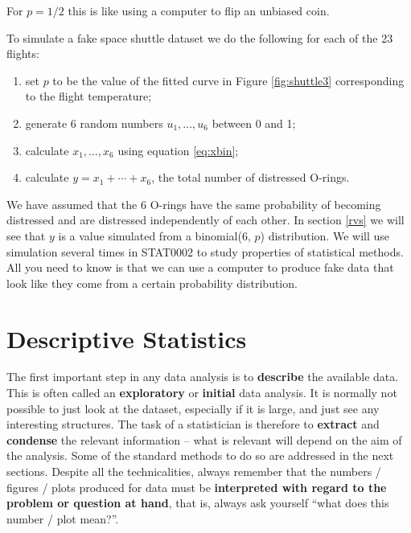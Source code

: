 \documentclass[
  british,
]{book}
\providecommand{\tightlist}{%
  \setlength{\itemsep}{0pt}\setlength{\parskip}{0pt}}
\begin{document}
For \(p=1/2\) this is like using a computer to flip an unbiased coin.

To simulate a fake space shuttle dataset we do the following for each of the 23 flights:

\begin{enumerate}
\def\labelenumi{\arabic{enumi}.}
\tightlist
\item
  set \(p\) to be the value of the fitted curve in Figure \ref{fig:shuttle3} corresponding to the flight temperature;
\item
  generate 6 random numbers \(u_1, \ldots, u_6\) between 0 and 1;
\item
  calculate \(x_1, \ldots, x_6\) using equation \eqref{eq:xbin};
\item
  calculate \(y=x_1+\cdots+x_6\), the total number of distressed O-rings.
\end{enumerate}

We have assumed that the 6 O-rings have the same probability of becoming distressed and are distressed independently of each other. In section \ref{rvs} we will see that \(y\) is a value simulated from a binomial(6, \(p\)) distribution. We will use simulation several times in STAT0002 to study properties of statistical methods. All you need to know is that we can use a computer to produce fake data that look like they come from a certain probability distribution.

\FloatBarrier

\hypertarget{descriptive-statistics}{%
\chapter{Descriptive Statistics}\label{descriptive-statistics}}

The first important step in any data analysis is to \textbf{describe} the
available data. This is often called an \textbf{exploratory} or \textbf{initial} data analysis. It is normally not possible to just look at the dataset, especially if it is large, and just see any interesting structures. The task of a statistician is therefore to \textbf{extract} and \textbf{condense} the relevant information -- what is relevant will depend on the aim of the analysis. Some of the standard methods to do so are addressed in the next sections. Despite all the technicalities, always remember that the numbers / figures / plots produced for data must be \textbf{interpreted with regard to the problem or question at hand}, that is, always ask yourself ``what does this number / plot mean?''.
\end{document}
